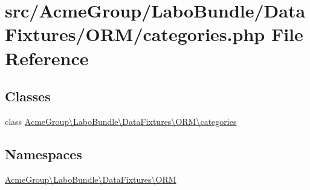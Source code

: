 \hypertarget{categories_8php}{\section{src/\+Acme\+Group/\+Labo\+Bundle/\+Data\+Fixtures/\+O\+R\+M/categories.php File Reference}
\label{categories_8php}
}
\subsection*{Classes}
\begin{DoxyCompactItemize}
\item 
class \hyperlink{class_acme_group_1_1_labo_bundle_1_1_data_fixtures_1_1_o_r_m_1_1categories}{Acme\+Group\textbackslash{}\+Labo\+Bundle\textbackslash{}\+Data\+Fixtures\textbackslash{}\+O\+R\+M\textbackslash{}categories}
\end{DoxyCompactItemize}
\subsection*{Namespaces}
\begin{DoxyCompactItemize}
\item 
 \hyperlink{namespace_acme_group_1_1_labo_bundle_1_1_data_fixtures_1_1_o_r_m}{Acme\+Group\textbackslash{}\+Labo\+Bundle\textbackslash{}\+Data\+Fixtures\textbackslash{}\+O\+R\+M}
\end{DoxyCompactItemize}
